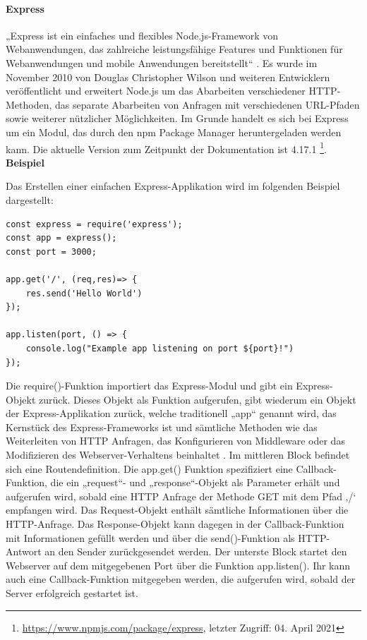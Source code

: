 \paragraph{Express}
„Express ist ein einfaches und flexibles Node.js-Framework von Webanwendungen, das zahlreiche leistungsfähige Features und Funktionen für Webanwendungen und mobile Anwendungen bereitstellt“ \cite{Node1.6}.  
Es wurde im November 2010 von Douglas Christopher Wilson und weiteren Entwicklern veröffentlicht und erweitert Node.js um das Abarbeiten verschiedener HTTP-Methoden, das separate Abarbeiten von Anfragen mit verschiedenen URL-Pfaden sowie weiterer nützlicher Möglichkeiten. Im Grunde handelt es sich bei Express um ein Modul, das durch den npm Package Manager heruntergeladen werden kann. Die aktuelle Version zum Zeitpunkt der Dokumentation ist 4.17.1 \footnote{\url{https://www.npmjs.com/package/express}, letzter Zugriff: 04. April 2021}.
\newline
\newline
\textbf{Beispiel}
\newline

\noindent
Das Erstellen einer einfachen Express-Applikation wird im folgenden Beispiel dargestellt:\newline

\begin{lstlisting}[caption=Einfacher Webserver \protect \footnotemark,label=lst:Middleware]
const express = require('express');
const app = express();
const port = 3000;

app.get('/', (req,res)=> {
	res.send('Hello World')
});

app.listen(port, () => {
	console.log("Example app listening on port ${port}!")
});
\end{lstlisting}

\noindent
Die require()-Funktion importiert das Express-Modul und gibt ein Express-Objekt zurück. 
Dieses Objekt als Funktion aufgerufen, gibt wiederum ein Objekt der Express-Applikation zurück, welche traditionell „app“ genannt wird, das Kernstück des Express-Frameworks ist und sämtliche Methoden wie das Weiterleiten von HTTP Anfragen, das Konfigurieren von Middleware oder das Modifizieren des Webserver-Verhaltens beinhaltet \cite{Node1.8}.
\newline
\noindent
Im mittleren Block befindet sich eine Routendefinition. Die app.get() Funktion spezifiziert eine Callback-Funktion, die ein „request“- und „response“-Objekt als Parameter erhält und aufgerufen wird, sobald eine HTTP Anfrage der Methode GET mit dem Pfad ‚/‘ empfangen wird. Das Request-Objekt enthält sämtliche Informationen über die HTTP-Anfrage. Das Response-Objekt kann dagegen in der Callback-Funktion mit Informationen gefüllt werden und über die send()-Funktion als HTTP-Antwort an den Sender zurückgesendet werden.
\newline
\noindent
Der unterste Block startet den Webserver auf dem mitgegebenen Port über die Funktion app.listen(). Ihr kann auch eine Callback-Funktion mitgegeben werden, die aufgerufen wird, sobald der Server erfolgreich gestartet ist.
\newpage

